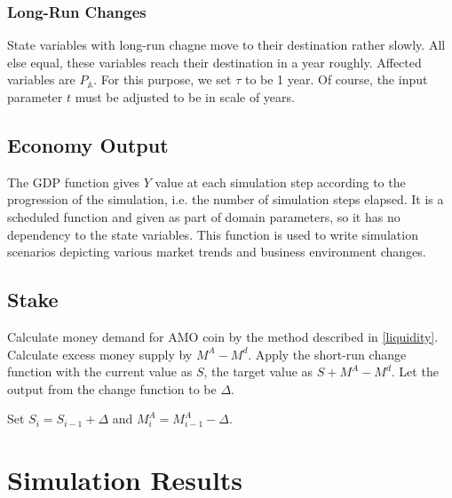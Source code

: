 \documentclass[a4paper,11pt]{scrartcl}
\newcommand{\amom}{\mathbb{A}}
\begin{document}
\subsubsection{Long-Run Changes}
State variables with long-run chagne move to their destination rather slowly.
All else equal, these variables reach their destination in a year roughly.
Affected variables are $P_\amom$. For this purpose, we set $\tau$ to be 1 year.
Of course, the input parameter $t$ must be adjusted to be in scale of years.

\subsection{Economy Output}
The GDP function gives $Y$ value at each simulation step according to the
progression of the simulation, i.e. the number of simulation steps elapsed. It
is a scheduled function and given as part of domain parameters, so it has no
dependency to the state variables. This function is used to write simulation
scenarios depicting various market trends and business environment changes.

\subsection{Stake}
Calculate money demand for AMO coin by the method described in
\ref{liquidity}. Calculate excess money supply by $M^A - M^d$. Apply the
short-run change function with the current value as $S$, the target value as
$S + M^A - M^d$. Let the output from the change function to be $\Delta$.

Set $S_i = S_{i-1} + \Delta$ and $M^A_i = M^A_{i-1} - \Delta$.

\section{Simulation Results}
\end{document}
